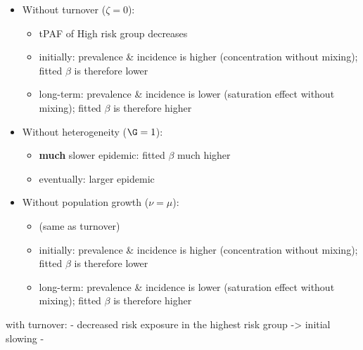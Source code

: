 \begin{itemize}
  \item Without turnover ($\zeta = 0$):
  \begin{itemize}
    \item tPAF of High risk group decreases
    \item initially: prevalence \& incidence is higher (concentration without mixing);
    fitted $\beta$ is therefore lower
    \item long-term: prevalence \& incidence is lower (saturation effect without mixing);
    fitted $\beta$ is therefore higher
  \end{itemize}
  \item Without heterogeneity ($\G = 1$):
  \begin{itemize}
    \item \textbf{much} slower epidemic: fitted $\beta$ much higher
    \item eventually: larger epidemic
  \end{itemize}
  \item Without population growth ($\nu = \mu$):
  \begin{itemize}
    \item (same as turnover)
    \item initially: prevalence \& incidence is higher (concentration without mixing);
    fitted $\beta$ is therefore lower
    \item long-term: prevalence \& incidence is lower (saturation effect without mixing);
    fitted $\beta$ is therefore higher
  \end{itemize}
\end{itemize}
 with turnover: - decreased risk exposure in the highest risk group -> initial slowing
                - 
